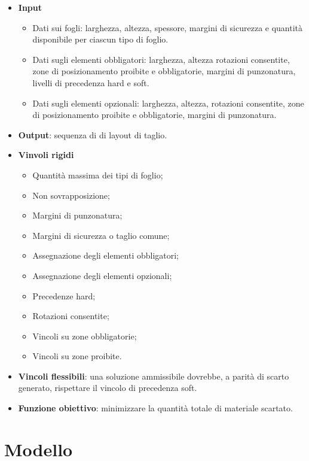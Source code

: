 \begin{itemize}
    \item \textbf{Input}
    \begin{itemize}
        \item Dati sui fogli: larghezza, altezza, spessore, margini di sicurezza e quantità disponibile per ciascun tipo di foglio.
        \item Dati sugli elementi obbligatori: larghezza, altezza rotazioni consentite, zone di posizionamento proibite e obbligatorie, margini di punzonatura, livelli di precedenza hard e soft.
        \item Dati sugli elementi opzionali: larghezza, altezza, rotazioni consentite, zone di posizionamento proibite e obbligatorie, margini di punzonatura.
    \end{itemize}
    \item \textbf{Output}: sequenza di di layout di taglio.
    \item \textbf{Vinvoli rigidi}
    \begin{itemize}
        \item Quantità massima dei tipi di foglio;
        \item Non sovrapposizione;
        \item Margini di punzonatura;
        \item Margini di sicurezza o taglio comune;
        \item Assegnazione degli elementi obbligatori;
        \item Assegnazione degli elementi opzionali;
        \item Precedenze hard;
        \item Rotazioni consentite;
        \item Vincoli su zone obbligatorie;
        \item Vincoli su zone proibite.
    \end{itemize}
    \item \textbf{Vincoli flessibili}: una soluzione ammissibile dovrebbe, a parità di scarto generato, rispettare il vincolo di precedenza soft.
    \item \textbf{Funzione obiettivo}: minimizzare la quantità totale di materiale scartato.
\end{itemize}

\section{Modello}

